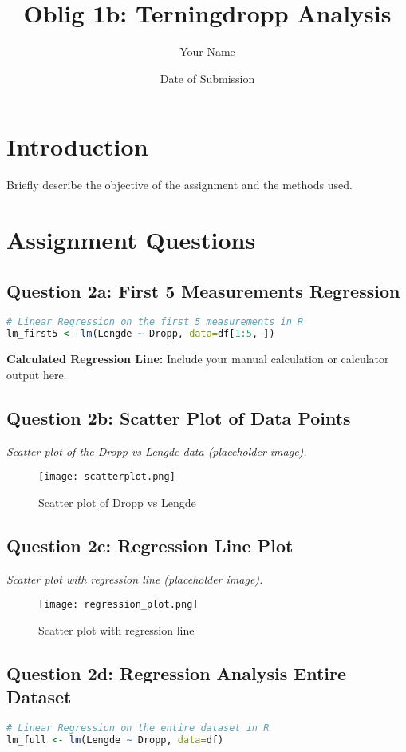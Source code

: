 \documentclass{article}
\title{Oblig 1b: Terningdropp Analysis}
\author{Your Name}
\date{Date of Submission}
\begin{document}
\maketitle

\section{Introduction}
Briefly describe the objective of the assignment and the methods used.

\section{Assignment Questions}

\subsection{Question 2a: First 5 Measurements Regression}
\begin{lstlisting}[language=R]
# Linear Regression on the first 5 measurements in R
lm_first5 <- lm(Lengde ~ Dropp, data=df[1:5, ])
\end{lstlisting}
\textbf{Calculated Regression Line:} Include your manual calculation or calculator output here.

\subsection{Question 2b: Scatter Plot of Data Points}
\textit{Scatter plot of the Dropp vs Lengde data (placeholder image).}
\begin{figure}[h]
    \centering
    \texttt{[image: scatterplot.png]}
    \caption{Scatter plot of Dropp vs Lengde}
\end{figure}

\subsection{Question 2c: Regression Line Plot}
\textit{Scatter plot with regression line (placeholder image).}
\begin{figure}[h]
    \centering
    \texttt{[image: regression\_plot.png]}
    \caption{Scatter plot with regression line}
\end{figure}

\subsection{Question 2d: Regression Analysis Entire Dataset}
\begin{lstlisting}[language=R]
# Linear Regression on the entire dataset in R
lm_full <- lm(Lengde ~ Dropp, data=df)
\end{lstlisting}
\end{document}
